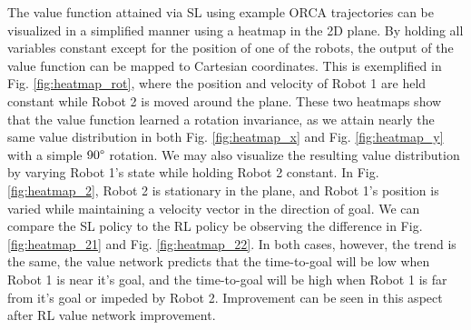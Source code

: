 \documentclass[conference]{IEEEtran}
\begin{document}
The value function attained via SL using example ORCA trajectories can be visualized in a simplified manner using a heatmap in the 2D plane. By holding all variables constant except for the position of one of the robots, the output of the value function can be mapped to Cartesian coordinates. This is exemplified in Fig. \ref{fig:heatmap_rot}, where the position and velocity of Robot 1 are held constant while Robot 2 is moved around the plane. These two heatmaps show that the value function learned a rotation invariance, as we attain nearly the same value distribution in both Fig. \ref{fig:heatmap_x} and  Fig. \ref{fig:heatmap_y} with a simple $90\degree$ rotation. We may also visualize the resulting value distribution by varying Robot 1's state while holding Robot 2 constant. In Fig. \ref{fig:heatmap_2}, Robot 2 is stationary in the plane, and Robot 1's position is varied while maintaining a velocity vector in the direction of goal. We can compare the SL policy to the RL policy be observing the difference in Fig. \ref{fig:heatmap_21} and Fig. \ref{fig:heatmap_22}. In both cases, however, the trend is the same, the value network predicts that the time-to-goal will be low when Robot 1 is near it's goal, and the time-to-goal will be high when Robot 1 is far from it's goal or impeded by Robot 2. Improvement can be seen in this aspect after RL value network improvement.
\end{document}
